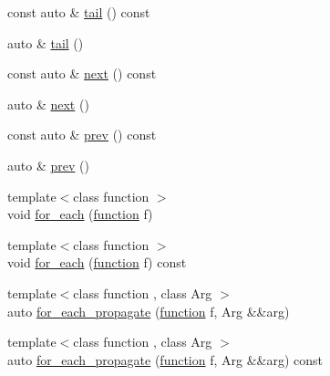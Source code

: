 \begin{DoxyCompactItemize}
\item 
const auto \& \hyperlink{structbc_1_1nn_1_1LayerChain_3_01Index_00_01Derived_00_01CurrentLayer_00_01Layers_8_8_8_01_4_a3a05238fc0d791091e1becb507a20880}{tail} () const
\item 
auto \& \hyperlink{structbc_1_1nn_1_1LayerChain_3_01Index_00_01Derived_00_01CurrentLayer_00_01Layers_8_8_8_01_4_a7b9b92a1c7372cfb57a1631a7352a55a}{tail} ()
\item 
const auto \& \hyperlink{structbc_1_1nn_1_1LayerChain_3_01Index_00_01Derived_00_01CurrentLayer_00_01Layers_8_8_8_01_4_ab74065c94529dadc44641077a88c0a34}{next} () const
\item 
auto \& \hyperlink{structbc_1_1nn_1_1LayerChain_3_01Index_00_01Derived_00_01CurrentLayer_00_01Layers_8_8_8_01_4_aae07e89deefe57369906dfcd07543ef2}{next} ()
\item 
const auto \& \hyperlink{structbc_1_1nn_1_1LayerChain_3_01Index_00_01Derived_00_01CurrentLayer_00_01Layers_8_8_8_01_4_a559993161b9fcdad25f20afb5cc13c01}{prev} () const
\item 
auto \& \hyperlink{structbc_1_1nn_1_1LayerChain_3_01Index_00_01Derived_00_01CurrentLayer_00_01Layers_8_8_8_01_4_a2277855d710ac9d482f1c04ee23e45fd}{prev} ()
\item 
{\footnotesize template$<$class function $>$ }\\void \hyperlink{structbc_1_1nn_1_1LayerChain_3_01Index_00_01Derived_00_01CurrentLayer_00_01Layers_8_8_8_01_4_aa4a17c0b77df5cf1a72ef7da1e8013ad}{for\+\_\+each} (\hyperlink{namespacebc_1_1nn_a0fef36d0002a6d7c7cb619d7e27d5c1e}{function} f)
\item 
{\footnotesize template$<$class function $>$ }\\void \hyperlink{structbc_1_1nn_1_1LayerChain_3_01Index_00_01Derived_00_01CurrentLayer_00_01Layers_8_8_8_01_4_a56180d736fc72f7180fc3532bfa408cc}{for\+\_\+each} (\hyperlink{namespacebc_1_1nn_a0fef36d0002a6d7c7cb619d7e27d5c1e}{function} f) const
\item 
{\footnotesize template$<$class function , class Arg $>$ }\\auto \hyperlink{structbc_1_1nn_1_1LayerChain_3_01Index_00_01Derived_00_01CurrentLayer_00_01Layers_8_8_8_01_4_a6526c948665cccba9ce4079fd25df897}{for\+\_\+each\+\_\+propagate} (\hyperlink{namespacebc_1_1nn_a0fef36d0002a6d7c7cb619d7e27d5c1e}{function} f, Arg \&\&arg)
\item 
{\footnotesize template$<$class function , class Arg $>$ }\\auto \hyperlink{structbc_1_1nn_1_1LayerChain_3_01Index_00_01Derived_00_01CurrentLayer_00_01Layers_8_8_8_01_4_af78dcdf5ccf955f02895885fc6c4b20c}{for\+\_\+each\+\_\+propagate} (\hyperlink{namespacebc_1_1nn_a0fef36d0002a6d7c7cb619d7e27d5c1e}{function} f, Arg \&\&arg) const

\end{DoxyCompactItemize}
